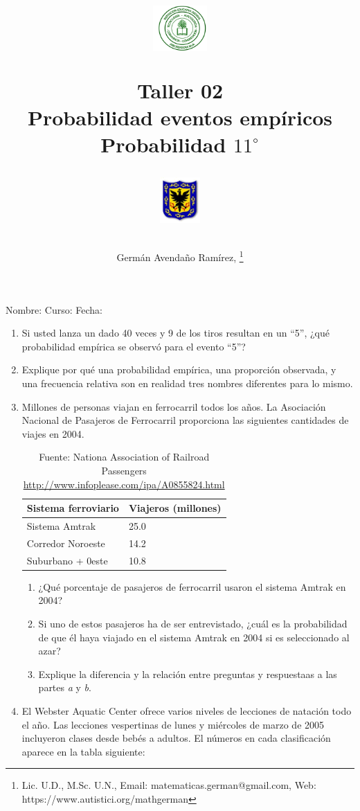 \documentclass[11pt,twoside]{article}
\author{Germ\'an Avenda\~no Ram\'irez, \thanks{Lic. U.D., M.Sc. U.N., Email: matematicas.german@gmail.com, Web: https://www.autistici.org/mathgerman}}
\title{\begin{minipage}{.2\textwidth}
\includegraphics[height=1.75cm]{Images/logo-colegio.png}\end{minipage}
\begin{minipage}{.55\textwidth}
\begin{center}
Taller 02\\
Probabilidad eventos empíricos\\
Probabilidad $11^{\circ}$
\end{center}
\end{minipage}\hfill
\begin{minipage}{.2\textwidth}
\includegraphics[height=1.75cm]{Images/logo-sed.png} 
\end{minipage}}
\date{}
\begin{document}
\maketitle
Nombre: \hrulefill Curso: \underline{\hspace*{44pt}} Fecha: \underline{\hspace*{2.5cm}}
 \begin{enumerate}
  \item Si usted lanza un dado 40 veces y 9 de los tiros resultan en un ``5'', ¿qué probabilidad empírica se observó para el evento ``5''?
  \item Explique por qué una probabilidad empírica, una proporción observada, y una frecuencia relativa son en realidad tres nombres diferentes para lo mismo.
  \item Millones de personas viajan en ferrocarril todos los años. La Asociación Nacional de Pasajeros de Ferrocarril proporciona las siguientes cantidades de viajes en 2004.
  \begin{table}[h!]
\begin{center}
\begin{tabular}{ll}
Sistema ferroviario & Viajeros (millones)\\ \hline
Sistema Amtrak & 25.0\\
Corredor Noroeste & 14.2\\
Suburbano + 0este & 10.8 \\ \hline
  \end{tabular}
  \end{center}\caption{Fuente: Nationa Association of Railroad Passengers \url{http://www.infoplease.com/ipa/A0855824.html}}
              \end{table} 
\begin{enumerate}
 \item ¿Qué porcentaje de pasajeros de ferrocarril usaron
el sistema Amtrak en 2004?
\item Si uno de estos pasajeros ha de ser entrevistado, ¿cuál es la probabilidad de que él haya viajado en el sistema Amtrak en 2004 si es seleccionado al azar?
\item Explique la diferencia y la relación entre preguntas y respuestaas  a las partes \textit{a} y \textit{b}.
\end{enumerate}
\item El Webster Aquatic Center ofrece varios niveles de lecciones de natación todo el año. Las lecciones vespertinas de lunes y miércoles de marzo de 2005 incluyeron clases desde bebés a adultos. El números en cada clasificación aparece en la tabla siguiente:

\end{enumerate}
\end{document}
